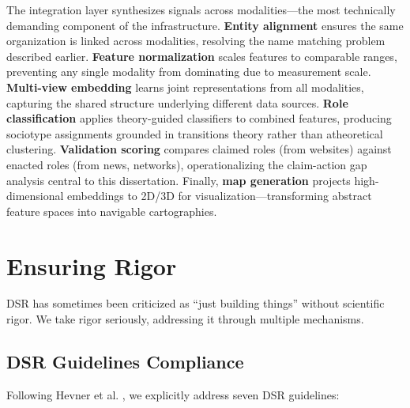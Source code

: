 \documentclass[../main.tex]{subfiles}
\begin{document}
The integration layer synthesizes signals across modalities---the most technically demanding component of the infrastructure. \textbf{Entity alignment} ensures the same organization is linked across modalities, resolving the name matching problem described earlier. \textbf{Feature normalization} scales features to comparable ranges, preventing any single modality from dominating due to measurement scale. \textbf{Multi-view embedding} learns joint representations from all modalities, capturing the shared structure underlying different data sources. \textbf{Role classification} applies theory-guided classifiers to combined features, producing sociotype assignments grounded in transitions theory rather than atheoretical clustering. \textbf{Validation scoring} compares claimed roles (from websites) against enacted roles (from news, networks), operationalizing the claim-action gap analysis central to this dissertation. Finally, \textbf{map generation} projects high-dimensional embeddings to 2D/3D for visualization---transforming abstract feature spaces into navigable cartographies.


\section{Ensuring Rigor}

DSR has sometimes been criticized as ``just building things'' without scientific rigor. We take rigor seriously, addressing it through multiple mechanisms.

\subsection{DSR Guidelines Compliance}

Following Hevner et al. \cite{hevner2004design}, we explicitly address seven DSR guidelines:
\end{document}

